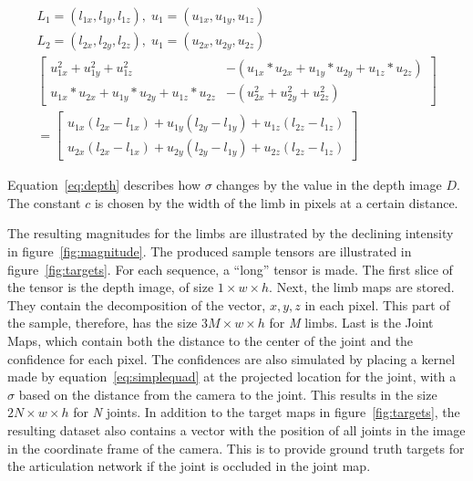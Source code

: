 \begin{equation}
  \label{eq:closestpoints}
  \begin{split}
  L_1 = (l_{1x}, l_{1y}, l_{1z}), \; u_1 = (u_{1x}, u_{1y}, u_{1z}) \\
  L_2 = (l_{2x}, l_{2y}, l_{2z}), \; u_1 = (u_{2x}, u_{2y}, u_{2z}) \\[20pt]
  \begin{bmatrix}
    u_{1x}^{2} + u_{1y}^{2} + u_{1z}^{2} & -(u_{1x} * u_{2x} + u_{1y} * u_{2y} + u_{1z} * u_{2z}) \\
    u_{1x} * u_{2x} + u_{1y} * u_{2y} + u_{1z} * u_{2z} & -(u_{2x}^{2} + u_{2y}^{2} + u_{2z}^{2})
  \end{bmatrix} \\
  = 
  \begin{bmatrix}
    u_{1x} (l_{2x} - l_{1x}) + u_{1y} (l_{2y} - l_{1y}) + u_{1z} (l_{2z} - l_{1z}) \\
    u_{2x} (l_{2x} - l_{1x}) + u_{2y} (l_{2y} - l_{1y}) + u_{2z} (l_{2z} - l_{1z})
  \end{bmatrix}
  \end{split}
\end{equation}

Equation~\ref{eq:depth} describes how $\sigma$ changes by the value in the depth image $D$. The constant $c$ is chosen by the width of the limb in pixels at a certain distance.

The resulting magnitudes for the limbs are illustrated by the declining intensity in figure~\ref{fig:magnitude}. The produced sample tensors are illustrated in figure~\ref{fig:targets}. For each sequence, a ``long'' tensor is made. The first slice of the tensor is the depth image, of size $1 \times w \times h$. Next, the limb maps are stored. They contain the decomposition of the vector, $x, y, z$ in each pixel. This part of the sample, therefore, has the size $3M \times w \times h$ for \emph{M} limbs. Last is the Joint Maps, which contain both the distance to the center of the joint and the confidence for each pixel. The confidences are also simulated by placing a kernel made by equation~\ref{eq:simplequad} at the projected location for the joint, with a $\sigma$ based on the distance from the camera to the joint. This results in the size $2N \times w \times h$ for \emph{N} joints. In addition to the target maps in figure~\ref{fig:targets}, the resulting dataset also contains a vector with the position of all joints in the image in the coordinate frame of the camera. This is to provide ground truth targets for the articulation network if the joint is occluded in the joint map.

